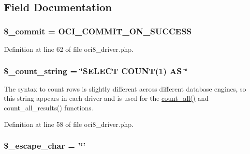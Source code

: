 \subsection{Field Documentation}
\hypertarget{class_c_i___d_b__oci8__driver_ad068581ef6fdb05bd46df66870beef79}{
\subsubsection[{\$\-\_\-commit}]{\setlength{\rightskip}{0pt plus 5cm}\$\-\_\-commit = O\-C\-I\-\_\-\-C\-O\-M\-M\-I\-T\-\_\-\-O\-N\-\_\-\-S\-U\-C\-C\-E\-S\-S}}\label{class_c_i___d_b__oci8__driver_ad068581ef6fdb05bd46df66870beef79}


Definition at line 62 of file oci8\-\_\-driver.\-php.

\hypertarget{class_c_i___d_b__oci8__driver_a06c80bac2ecbd0557827e96949c23097}{
\subsubsection[{\$\-\_\-count\-\_\-string}]{\setlength{\rightskip}{0pt plus 5cm}\$\-\_\-count\-\_\-string = \char`\"{}S\-E\-L\-E\-C\-T C\-O\-U\-N\-T(1) A\-S \char`\"{}}}\label{class_c_i___d_b__oci8__driver_a06c80bac2ecbd0557827e96949c23097}
The syntax to count rows is slightly different across different database engines, so this string appears in each driver and is used for the \hyperlink{class_c_i___d_b__oci8__driver_a66111c61856499b091af32502978d4fc}{count\-\_\-all()} and count\-\_\-all\-\_\-results() functions. 

Definition at line 58 of file oci8\-\_\-driver.\-php.

\hypertarget{class_c_i___d_b__oci8__driver_aaec2fb0112850159063a8e47ad3aed6e}{
\subsubsection[{\$\-\_\-escape\-\_\-char}]{\setlength{\rightskip}{0pt plus 5cm}\$\-\_\-escape\-\_\-char = '\char`\"{}'}}\label{class_c_i___d_b__oci8__driver_aaec2fb0112850159063a8e47ad3aed6e}


